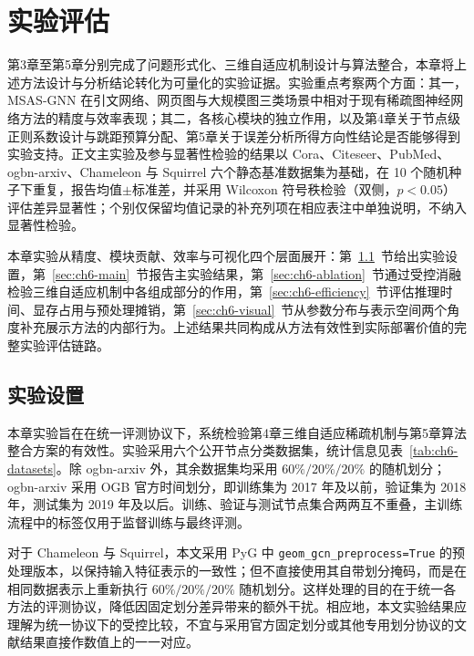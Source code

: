 
\chapter{实验评估}
\label{chap:ch6-experiment}

第3章至第5章分别完成了问题形式化、三维自适应机制设计与算法整合，本章将上述方法设计与分析结论转化为可量化的实验证据。实验重点考察两个方面：其一，MSAS-GNN 在引文网络、网页图与大规模图三类场景中相对于现有稀疏图神经网络方法的精度与效率表现；其二，各核心模块的独立作用，以及第4章关于节点级正则系数设计与跳距预算分配、第5章关于误差分析所得方向性结论是否能够得到实验支持。正文主实验及参与显著性检验的结果以 Cora、Citeseer、PubMed、ogbn-arxiv、Chameleon 与 Squirrel 六个静态基准数据集为基础，在 10 个随机种子下重复，报告均值$\pm$标准差，并采用 Wilcoxon 符号秩检验\cite{Wilcoxon1945Ranking}（双侧，$p<0.05$）评估差异显著性；个别仅保留均值记录的补充列项在相应表注中单独说明，不纳入显著性检验。

本章实验从精度、模块贡献、效率与可视化四个层面展开：第~\ref{sec:ch6-setup}~节给出实验设置，第~\ref{sec:ch6-main}~节报告主实验结果，第~\ref{sec:ch6-ablation}~节通过受控消融检验三维自适应机制中各组成部分的作用，第~\ref{sec:ch6-efficiency}~节评估推理时间、显存占用与预处理摊销，第~\ref{sec:ch6-visual}~节从参数分布与表示空间两个角度补充展示方法的内部行为。上述结果共同构成从方法有效性到实际部署价值的完整实验评估链路。

\section{实验设置}
\label{sec:ch6-setup}

本章实验旨在在统一评测协议下，系统检验第4章三维自适应稀疏机制与第5章算法整合方案的有效性。实验采用六个公开节点分类数据集，统计信息见表~\ref{tab:ch6-datasets}。除 ogbn-arxiv 外，其余数据集均采用 $60\%/20\%/20\%$ 的随机划分；ogbn-arxiv 采用 OGB 官方时间划分，即训练集为 2017 年及以前，验证集为 2018 年，测试集为 2019 年及以后\cite{Hu2020OGB}。训练、验证与测试节点集合两两互不重叠，主训练流程中的标签仅用于监督训练与最终评测。

对于 Chameleon 与 Squirrel，本文采用 PyG 中 \texttt{geom\_gcn\_preprocess=True} 的预处理版本，以保持输入特征表示的一致性；但不直接使用其自带划分掩码，而是在相同数据表示上重新执行 $60\%/20\%/20\%$ 随机划分。这样处理的目的在于统一各方法的评测协议，降低因固定划分差异带来的额外干扰。相应地，本文实验结果应理解为统一协议下的受控比较，不宜与采用官方固定划分或其他专用划分协议的文献结果直接作数值上的一一对应。

